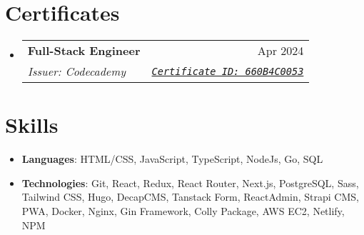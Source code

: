 \documentclass[letterpaper,11pt]{article}
\makeatletter
\newcommand{\resumeSubheading}[4]{
  \vspace{-1pt}\item
    \begin{tabular*}{0.97\textwidth}[t]{l@{\extracolsep{\fill}}r}
      \textbf{#1} & #2 \\
      \textit{\small#3} & \textit{\small #4} \\
    \end{tabular*}\vspace{-5pt}
}
\newcommand{\resumeSubHeadingListStart}{\begin{itemize}[leftmargin=*]}
\newcommand{\resumeSubHeadingListEnd}{\end{itemize}}
\newcommand{\resumeCertificate}[5]{
  \resumeSubheading
    {#1}{#2}
    {\vspace{-1pt}Issuer: #3}{\href{#4}{\texttt{#5}}}
}
\makeatother
\begin{document}
\section{Certificates}
  \resumeSubHeadingListStart
    \resumeCertificate
      {Full-Stack Engineer}{Apr 2024}
      {Codecademy}
      {https://www.codecademy.com/profiles/BeksultanAbdikaarov/certificates/ffd0f42cce1a44e9a0108b365047a0a6}
      {Certificate ID: 660B4C0053}
    \resumeSubHeadingListEnd



\section{Skills}
 \resumeSubHeadingListStart
   \item{
     \textbf{Languages}{: HTML/CSS, JavaScript, TypeScript, NodeJs, Go, SQL}
   }
   \item{
     \textbf{Technologies}{: Git, React, Redux, React Router, Next.js, PostgreSQL, Sass, Tailwind CSS, Hugo, DecapCMS, Tanstack Form, ReactAdmin, Strapi CMS, PWA, Docker, Nginx, Gin Framework, Colly Package, AWS EC2, Netlify, NPM}
   }
 \resumeSubHeadingListEnd

\end{document}
